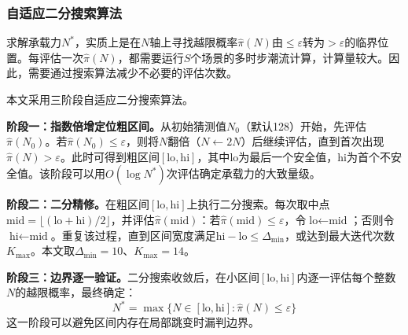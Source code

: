 \documentclass[10pt,a4paper]{article}
\numberwithin{equation}{section}
\numberwithin{table}{section}
\numberwithin{figure}{section}
\begin{document}
    \subsubsection{自适应二分搜索算法}

    求解承载力$N^*$，实质上是在$N$轴上寻找越限概率$\hat{\pi}(N)$由$\leq \varepsilon$转为$> \varepsilon$的临界位置。每评估一次$\hat{\pi}(N)$，都需要运行$S$个场景的多时步潮流计算，计算量较大。因此，需要通过搜索算法减少不必要的评估次数。

    本文采用三阶段自适应二分搜索算法。

    \noindent\textbf{阶段一：指数倍增定位粗区间。}从初始猜测值$N_0$（默认128）开始，先评估$\hat{\pi}(N_0)$。若$\hat{\pi}(N_0) \leq \varepsilon$，则将$N$翻倍（$N \leftarrow 2N$）后继续评估，直到首次出现$\hat{\pi}(N) > \varepsilon$。此时可得到粗区间$[\text{lo}, \text{hi}]$，其中$\text{lo}$为最后一个安全值，$\text{hi}$为首个不安全值。该阶段可以用$O(\log N^*)$次评估确定承载力的大致量级。

    \noindent\textbf{阶段二：二分精修。}在粗区间$[\text{lo}, \text{hi}]$上执行二分搜索。每次取中点$\text{mid} = \lfloor(\text{lo} + \text{hi})/2\rfloor$，并评估$\hat{\pi}(\text{mid})$：若$\hat{\pi}(\text{mid}) \leq \varepsilon$，令$\text{lo} \leftarrow \text{mid}$；否则令$\text{hi} \leftarrow \text{mid}$。重复该过程，直到区间宽度满足$\text{hi} - \text{lo} \leq \Delta_{\min}$，或达到最大迭代次数$K_{\max}$。本文取$\Delta_{\min} = 10$、$K_{\max} = 14$。

    \noindent\textbf{阶段三：边界逐一验证。}二分搜索收敛后，在小区间$[\text{lo}, \text{hi}]$内逐一评估每个整数$N$的越限概率，最终确定：
    \begin{equation}
    \label{eq:boundary_verification}
    N^* = \max\{N \in [\text{lo}, \text{hi}] : \hat{\pi}(N) \leq \varepsilon\}
    \end{equation}
    这一阶段可以避免区间内存在局部跳变时漏判边界。
\end{document}
